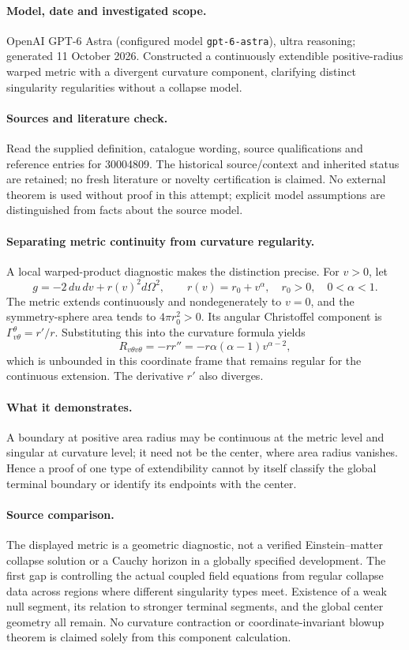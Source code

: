 \documentclass[11pt]{article}
\begin{document}
\paragraph{Model, date and investigated scope.}
OpenAI GPT-6 Astra (configured model \texttt{gpt-6-astra}), ultra reasoning; generated 11 October 2026. Constructed a continuously extendible positive-radius warped metric with a divergent curvature component, clarifying distinct singularity regularities without a collapse model.

\paragraph{Sources and literature check.}
Read the supplied definition, catalogue wording, source qualifications and reference entries for 30004809. The historical source/context and inherited status are retained; no fresh literature or novelty certification is claimed. No external theorem is used without proof in this attempt; explicit model assumptions are distinguished from facts about the source model.

\paragraph{Separating metric continuity from curvature regularity.} A local warped-product diagnostic makes the distinction precise. For \(v>0\), let
\[
 g=-2\,du\,dv+r(v)^2d\Omega^2,\qquad r(v)=r_0+v^\alpha,
 \quad r_0>0,\quad0<\alpha<1.
\]
The metric extends continuously and nondegenerately to \(v=0\), and the symmetry-sphere area tends to \(4\pi r_0^2>0\). Its angular Christoffel component is \(\Gamma^\theta_{v\theta}=r'/r\). Substituting this into the curvature formula yields
\[
 R_{v\theta v\theta}=-rr''=-r\alpha(\alpha-1)v^{\alpha-2},
\]
which is unbounded in this coordinate frame that remains regular for the continuous extension. The derivative \(r'\) also diverges.
\paragraph{What it demonstrates.} A boundary at positive area radius may be continuous at the metric level and singular at curvature level; it need not be the center, where area radius vanishes. Hence a proof of one type of extendibility cannot by itself classify the global terminal boundary or identify its endpoints with the center.
\paragraph{Source comparison.} The displayed metric is a geometric diagnostic, not a verified Einstein--matter collapse solution or a Cauchy horizon in a globally specified development. The first gap is controlling the actual coupled field equations from regular collapse data across regions where different singularity types meet. Existence of a weak null segment, its relation to stronger terminal segments, and the global center geometry all remain. No curvature contraction or coordinate-invariant blowup theorem is claimed solely from this component calculation.
\end{document}

